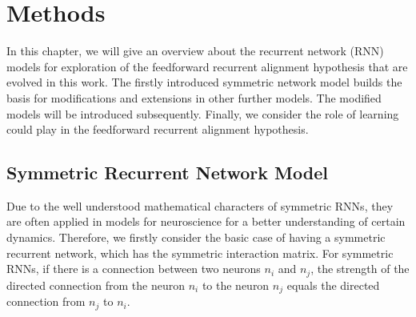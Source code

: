 \documentclass[11pt]{article}
\begin{document}
	
	\section{Methods}
	In this chapter, we will give an overview about the recurrent network (RNN) models for exploration of the feedforward recurrent alignment hypothesis that are evolved in this work. The firstly introduced symmetric network model builds the basis for modifications and extensions in other further models. The modified models will be introduced subsequently. Finally, we consider the role of learning could play in the feedforward recurrent alignment hypothesis. 
	
	\subsection{Symmetric Recurrent Network Model}
	Due to the well understood mathematical characters of symmetric RNNs, they are often applied in models for neuroscience for a better understanding of certain dynamics.  
	Therefore, we firstly consider the basic case of having a symmetric recurrent network, which has the symmetric interaction matrix. For symmetric RNNs, if there is a connection between two neurons $n_i$ and $n_j$, the strength of the directed connection from the neuron $n_i$ to the neuron $n_j$ equals the directed connection from $n_j$ to $n_i$. 
\end{document}
